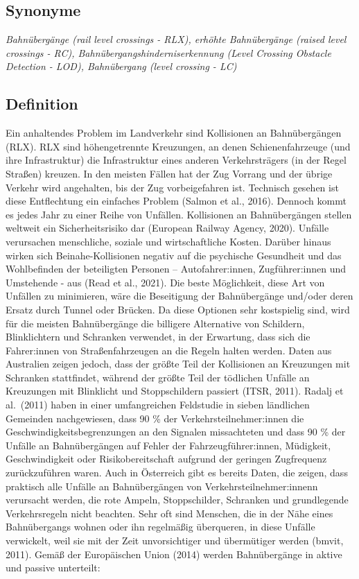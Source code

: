 \documentclass[
]{book}
\begin{document}
\hypertarget{synonyme-2}{%
\subsection*{Synonyme}\label{synonyme-2}}

\emph{Bahnübergänge (rail level crossings - RLX), erhöhte Bahnübergänge (raised level crossings - RC), Bahnübergangshinderniserkennung (Level Crossing Obstacle Detection - LOD), Bahnübergang (level crossing - LC)}

\hypertarget{definition-2}{%
\subsection*{Definition}\label{definition-2}}

Ein anhaltendes Problem im Landverkehr sind Kollisionen an Bahnübergängen (RLX). RLX sind höhengetrennte Kreuzungen, an denen Schienenfahrzeuge (und ihre Infrastruktur) die Infrastruktur eines anderen Verkehrsträgers (in der Regel Straßen) kreuzen. In den meisten Fällen hat der Zug Vorrang und der übrige Verkehr wird angehalten, bis der Zug vorbeigefahren ist. Technisch gesehen ist diese Entflechtung ein einfaches Problem (Salmon et al., 2016). Dennoch kommt es jedes Jahr zu einer Reihe von Unfällen.
Kollisionen an Bahnübergängen stellen weltweit ein Sicherheitsrisiko dar (European Railway Agency, 2020). Unfälle verursachen menschliche, soziale und wirtschaftliche Kosten. Darüber hinaus wirken sich Beinahe-Kollisionen negativ auf die psychische Gesundheit und das Wohlbefinden der beteiligten Personen -- Autofahrer:innen, Zugführer:innen und Umstehende - aus (Read et al., 2021). Die beste Möglichkeit, diese Art von Unfällen zu minimieren, wäre die Beseitigung der Bahnübergänge und/oder deren Ersatz durch Tunnel oder Brücken. Da diese Optionen sehr kostspielig sind, wird für die meisten Bahnübergänge die billigere Alternative von Schildern, Blinklichtern und Schranken verwendet, in der Erwartung, dass sich die Fahrer:innen von Straßenfahrzeugen an die Regeln halten werden. Daten aus Australien zeigen jedoch, dass der größte Teil der Kollisionen an Kreuzungen mit Schranken stattfindet, während der größte Teil der tödlichen Unfälle an Kreuzungen mit Blinklicht und Stoppschildern passiert (ITSR, 2011).
Radalj et al.~(2011) haben in einer umfangreichen Feldstudie in sieben ländlichen Gemeinden nachgewiesen, dass 90 \% der Verkehrsteilnehmer:innen die Geschwindigkeitsbegrenzungen an den Signalen missachteten und dass 90 \% der Unfälle an Bahnübergängen auf Fehler der Fahrzeugführer:innen, Müdigkeit, Geschwindigkeit oder Risikobereitschaft aufgrund der geringen Zugfrequenz zurückzuführen waren. Auch in Österreich gibt es bereits Daten, die zeigen, dass praktisch alle Unfälle an Bahnübergängen von Verkehrsteilnehmer:innenn verursacht werden, die rote Ampeln, Stoppschilder, Schranken und grundlegende Verkehrsregeln nicht beachten. Sehr oft sind Menschen, die in der Nähe eines Bahnübergangs wohnen oder ihn regelmäßig überqueren, in diese Unfälle verwickelt, weil sie mit der Zeit unvorsichtiger und übermütiger werden (bmvit, 2011).
Gemäß der Europäischen Union (2014) werden Bahnübergänge in aktive und passive unterteilt:
\end{document}
